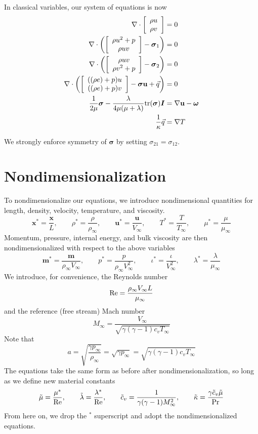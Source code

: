 \documentclass{article}
\newcommand{\grad}{\nabla}
\renewcommand{\div}{\grad \cdot}
\def\vecttwo#1#2{\left[
\begin{array}{c}
#1\\
#2\\
\end{array}
\right]}
\begin{document}
In classical variables, our system of equations is now
\begin{align*}
\div \vecttwo{\rho u }{\rho v} &= 0\\
\div \left(\vecttwo{\rho u^2+p }{\rho u v} - \boldsymbol \sigma_{1}\right) &=0\\
\div \left(\vecttwo{\rho u v}{\rho v^2+p } - \boldsymbol \sigma_{2}\right) &=0\\
\div \left(\vecttwo{((\rho e)+p)u}{((\rho e)+p)v} - \boldsymbol\sigma \mathbf{u} + \vec{q}\right) &=0\\
\frac{1}{2\mu} \boldsymbol \sigma - \frac{\lambda}{4\mu (\mu + \lambda)} { \rm tr}(\boldsymbol \sigma) \boldsymbol I &= \grad \mathbf{u} - \boldsymbol \omega\\
\frac{1}{\kappa}\vec{q} &= \grad T
\end{align*}

We strongly enforce symmetry of $\boldsymbol \sigma$ by setting $\sigma_{21} = \sigma_{12}$.  

\section{Nondimensionalization}
To nondimensionalize our equations, we introduce nondimensional quantities for length, density, velocity, temperature, and viscosity. 
\[
\boldsymbol x^* = \frac{\boldsymbol x}{L}, \qquad \rho^* = \frac{\rho}{\rho_{\infty}}, \qquad \boldsymbol u^* = \frac{\boldsymbol u}{V_\infty}, \qquad T^* = \frac{T}{T_\infty}, \qquad \mu^* = \frac{\mu}{\mu_\infty}
\]
Momentum, pressure, internal energy, and bulk viscosity are then nondimensionalized with respect to the above variables
\[
\boldsymbol m^* = \frac{\boldsymbol m}{\rho_\infty V_\infty}, \qquad p^* = \frac{p}{\rho_\infty V_\infty^2}, \qquad \iota^* = \frac{\iota}{V_\infty^2}, \qquad \lambda^* = \frac{\lambda}{\mu_\infty}
\]
We introduce, for convenience, the Reynolds number
\[
{\rm Re} = \frac{\rho_\infty V_\infty L}{\mu_\infty} 
\]
and the reference (free stream) Mach number
\[
M_\infty = \frac{V_\infty}{\sqrt{\gamma(\gamma-1)c_vT_\infty}}
\]
Note that 
\[
a = \sqrt{\frac{\gamma p_\infty}{\rho_\infty}} = \sqrt{{\gamma p_\infty}} = \sqrt{\gamma(\gamma-1)c_vT_\infty}
\]
The equations take the same form as before after nondimensionalization, so long as we define new material constants
\[
\tilde{\mu} = \frac{\mu^*}{\rm Re}, \qquad \tilde{\lambda} = \frac{\lambda^*}{\rm Re}, \qquad \tilde{c}_v = \frac{1}{\gamma(\gamma-1)M_\infty^2}, \qquad \tilde{\kappa} = \frac{\gamma\tilde{c}_v\tilde{\mu}}{\rm Pr}
\]
From here on, we drop the $^*$ superscript and adopt the nondimensionalized equations.
\end{document}
